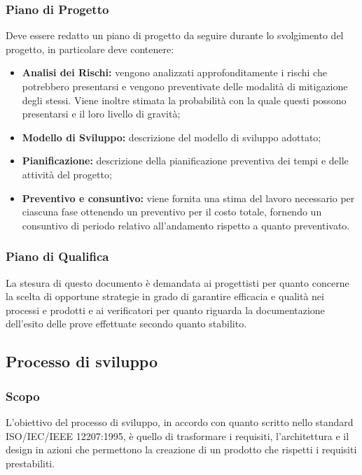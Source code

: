 \subsubsection{Piano di Progetto}
Deve essere redatto un piano di progetto da seguire durante lo svolgimento del progetto, in particolare deve contenere:

\begin{itemize}
  \item \textbf{Analisi dei Rischi:} vengono analizzati approfonditamente i rischi che potrebbero presentarsi e vengono preventivate delle modalità di mitigazione degli stessi. Viene inoltre stimata la probabilità con la quale questi possono presentarsi e il loro livello di gravità;
  \item \textbf{Modello di Sviluppo:} descrizione del modello di sviluppo adottato;
  \item \textbf{Pianificazione:} descrizione della pianificazione preventiva dei tempi e delle attività del progetto;
  \item \textbf{Preventivo e consuntivo:}  viene fornita una stima del lavoro necessario per ciascuna fase ottenendo un preventivo per il costo totale,  fornendo un consuntivo di periodo relativo all'andamento rispetto a quanto preventivato.
\end{itemize}

\subsubsection{Piano di Qualifica}
\label{_pianoDiQualifica}
La stesura di questo documento è demandata ai progettisti per quanto concerne la scelta di opportune strategie in grado di garantire efficacia e qualità nei processi e prodotti e ai verificatori per quanto riguarda la documentazione dell'esito delle prove effettuate secondo quanto stabilito.


\subsection{Processo di sviluppo}
\label{_processoDiSviluppo}
\subsubsection{Scopo}

L'obiettivo del processo di sviluppo, in accordo con quanto scritto nello standard ISO/IEC/IEEE 12207:1995, è quello di trasformare i requisiti, l'architettura e il design in azioni che permettono la creazione di un prodotto che rispetti i requisiti prestabiliti.


